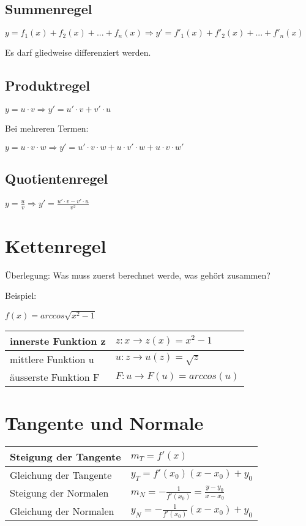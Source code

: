 \subsection{Summenregel}
\(y = f_1(x)+f_2(x)+ ... +f_n(x) \Rightarrow y'=f'_1(x) + f'_2(x)+...+f'_n(x)\)

Es darf gliedweise differenziert werden.
\subsection{Produktregel}
\(y=u \cdot v \Rightarrow y'=u' \cdot v + v' \cdot u\)

Bei mehreren Termen:

\(y=u \cdot v \cdot w \Rightarrow y'=u' \cdot v \cdot w + u \cdot v' \cdot w + u \cdot v \cdot w' \)
\subsection{Quotientenregel}
\(y = \frac{u}{v} \Rightarrow y' = \frac{u' \cdot v - v' \cdot u}{v^2}\)

\section{Kettenregel}
Überlegung: Was muss zuerst berechnet werde, was gehört zusammen?

Beispiel:

\hspace*{10mm} \(f(x) = arccos \sqrt{x^2-1} \)
\newline
\begin{tabular}{|l|l|}
	\hline
   	innerste Funktion z & \(z: x \rightarrow z(x) = x^2-1\) \\
	\hline
	mittlere Funktion u & \(u: z \rightarrow u(z) = \sqrt{z}\) \\
	\hline
	äusserste Funktion F & \(F: u \rightarrow F(u) = arccos(u) \) \\
	\hline
 \end{tabular}

\section{Tangente und Normale}
\begin{longtable}{p{}|p{}}
	Steigung der Tangente & \(m_T=f'(x)\)\\
	\hline
	Gleichung der Tangente & \(y_T = f'(x_0)(x-x_0) + y_0 \)\\
	\hline
	Steigung der Normalen & \(m_N=-\frac{1}{f'(x_0)} = \frac{y-y_0}{x-x_0} \)\\
	\hline
	Gleichung der Normalen & \(y_N = - \frac{1}{f'(x_0)}(x-x_0) + y_0 \) \\
\end{longtable}

